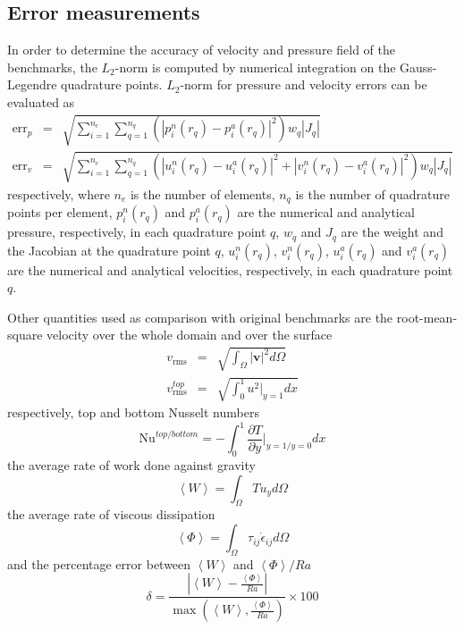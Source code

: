 \documentclass[hidelinks,10pt,a4paper]{article}
\begin{document}
\subsection{Error measurements}\label{sec:error}
In order to determine the accuracy of velocity and pressure field of the benchmarks, the $L_2$-norm is computed by numerical integration on the Gauss-Legendre
quadrature points. $L_2$-norm for pressure and velocity errors can be evaluated as
\begin{eqnarray}
\textrm{err}_p&=&\sqrt{\sum_{i=1}^{n_e}\sum_{q=1}^{n_q}\left(|p^n_i(r_q)-p^a_i(r_q)|^2\right)w_q|J_q|}\nonumber \\
\textrm{err}_v&=&\sqrt{\sum_{i=1}^{n_e}\sum_{q=1}^{n_q}\left(|u^n_i(r_q)-u^a_i(r_q)|^2+|v^n_i(r_q)-v^a_i(r_q)|^2\right)w_q|J_q|}\nonumber
\end{eqnarray}
respectively, where $n_e$ is the number of elements, $n_q$ is the number of quadrature points per element, $p^n_i(r_q)$ and $p^a_i(r_q)$ are the numerical and
analytical pressure, respectively, in each quadrature point $q$, $w_q$  and $J_q$ are the weight and the Jacobian at the quadrature point
$q$, $u^n_i(r_q)$, $v^n_i(r_q)$, $u^a_i(r_q)$ and $v^a_i(r_q)$ are the numerical and analytical velocities, respectively, in each quadrature point $q$.

Other quantities used as comparison with original benchmarks are the root-mean-square velocity over the whole domain and over the surface
\begin{eqnarray}
v_{\textrm{rms}}&=&\sqrt{\int_{\Omega}|\bm{v}|^2 d\Omega}\nonumber \\
v_{\textrm{rms}}^{top}&=&\sqrt{\int_0^1 u^2 \bigg|_{y=1} dx}\nonumber
\end{eqnarray}
respectively, top and bottom Nusselt numbers
\[\textrm{Nu}^{top/bottom}=-\int_0^1\frac{\partial T}{\partial y} \bigg|_{y=1/y=0} dx\]
the average rate of work done against gravity
\[\left\langle W \right\rangle=\int_{\Omega}T u_y d\Omega\]
the average rate of viscous dissipation
\[\left\langle \Phi \right\rangle=\int_{\Omega}\tau_{ij}\dot{\epsilon}_{ij} d\Omega\]
and the percentage error between $\left\langle W \right\rangle$ and $\left\langle \Phi \right\rangle/Ra$
\[\delta=\frac{\left|\left\langle W \right\rangle -\frac{\left\langle \Phi \right\rangle}{Ra} \right|}{\max \left(\left\langle W \right\rangle,
\frac{\left\langle \Phi \right\rangle}{Ra}\right)}\times100\]
\end{document}
